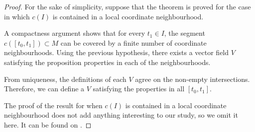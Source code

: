 \begin{proof}
	For the sake of simplicity, suppose that the theorem is proved for the case in which $c(I)$ is contained in a local coordinate neighbourhood.
	
	A compactness argument shows that for every $t_1 \in I$, the segment $c([t_0, t_1]) \subset M$ can be covered by a finite number of coordinate neighbourhoods. Using the previous hypothesis, there exists a vector field $V$ satisfying the proposition properties in each of the neighbourhoods.
	
	From uniqueness, the definitions of each $V$ agree on the non-empty intersections. Therefore, we can define a $V$ satisfying the properties in all $[t_0, t_1]$.
	
	The proof of the result for when $c(I)$ is contained in a local coordinate neighbourhood does not add anything interesting to our study, so we omit it here. It can be found on \cite[Ch. 2, Prop. 2.6]{docarmo79}.
\end{proof}